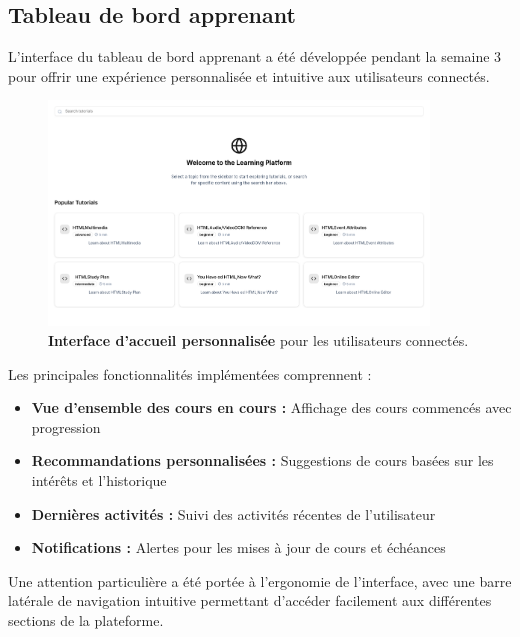 \subsection{Tableau de bord apprenant}

L'interface du tableau de bord apprenant a été développée pendant la semaine 3 pour offrir une expérience personnalisée et intuitive aux utilisateurs connectés.

\begin{figure}[H]
  \centering
  \includegraphics[width=0.9\textwidth,keepaspectratio]{week_3_img/accueil.png}
  \caption{\textbf{Interface d'accueil personnalisée} pour les utilisateurs connectés.}
  \label{fig:dashboard}
\end{figure}

Les principales fonctionnalités implémentées comprennent :
\begin{itemize}
  \item \textbf{Vue d'ensemble des cours en cours :} Affichage des cours commencés avec progression
  \item \textbf{Recommandations personnalisées :} Suggestions de cours basées sur les intérêts et l'historique
  \item \textbf{Dernières activités :} Suivi des activités récentes de l'utilisateur
  \item \textbf{Notifications :} Alertes pour les mises à jour de cours et échéances
\end{itemize}

Une attention particulière a été portée à l'ergonomie de l'interface, avec une barre latérale de navigation intuitive permettant d'accéder facilement aux différentes sections de la plateforme.

